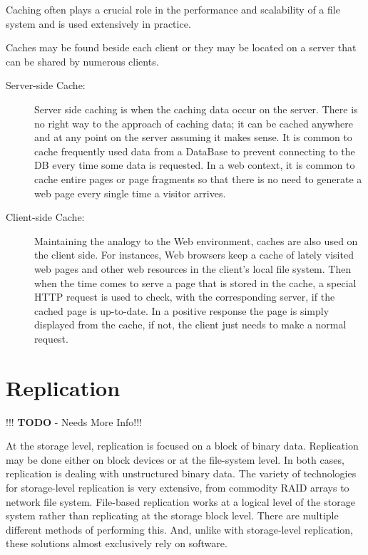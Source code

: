 Caching often plays a crucial role in the performance and scalability of a file system and is used extensively in practice.

Caches may be found beside each client or they may be located on a server that can be shared by numerous clients.

\begin{description}
	\item [Server-side Cache:] Server side caching is when the caching data occur on the server. There is no right way to the approach of caching data; it can be cached anywhere and at any point on the server assuming it makes sense. It is common to cache frequently used data from a DataBase to prevent connecting to the DB every time some data is requested. In a web context, it is common to cache entire pages or page fragments so that there is no need to generate a web page every single time a visitor arrives.
	\item [Client-side Cache:] Maintaining the analogy to the Web environment, caches are also used on the client side. For instances, Web browsers keep a cache of lately visited web pages and other web resources in the client’s local file system. Then when the time comes to serve a page that is stored in the cache, a special HTTP request is used to check, with the corresponding server, if the cached page is up-to-date. In a positive response the page is simply displayed from the cache, if not, the client just needs to make a normal request.
\end{description}

\newpage


\section{Replication}
\label{sec:replication}

!!! \textbf{TODO} - Needs More Info!!!

At the storage level, replication is focused on a block of binary data. Replication may be done either on block devices or at the file-system level. In both cases, replication is dealing with unstructured binary data. The variety of technologies for storage-level replication is very extensive, from commodity RAID arrays to network file system.
File-based replication works at a logical level of the storage system rather than replicating at the storage block level. There are multiple different methods of performing this. And, unlike with storage-level replication, these solutions almost exclusively rely on software.

